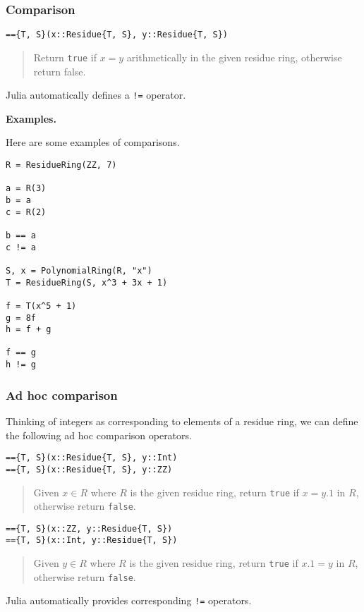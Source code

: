 \documentclass[a4paper,10pt]{article}
\newcommand{\code}{\lstinline}
\newcommand{\desc}[1]{\vspace{-3mm}\begin{quote}#1\end{quote}}
\begin{document}
{{{\subsubsection{Comparison}

\begin{lstlisting}
=={T, S}(x::Residue{T, S}, y::Residue{T, S})
\end{lstlisting}

\desc{Return \code{true} if $x = y$ arithmetically in the given residue ring, 
otherwise return false.}

Julia automatically defines a \code{!=} operator.

\textbf{Examples.}

Here are some examples of comparisons.

\begin{lstlisting}
R = ResidueRing(ZZ, 7)

a = R(3)
b = a
c = R(2)

b == a
c != a

S, x = PolynomialRing(R, "x")
T = ResidueRing(S, x^3 + 3x + 1)

f = T(x^5 + 1)
g = 8f
h = f + g

f == g
h != g
\end{lstlisting}

\subsubsection{Ad hoc comparison}

Thinking of integers as corresponding to elements of a residue ring, we
can define the following ad hoc comparison operators.

\begin{lstlisting}
=={T, S}(x::Residue{T, S}, y::Int)
=={T, S}(x::Residue{T, S}, y::ZZ)
\end{lstlisting}

\desc{Given $x \in R$ where $R$ is the given residue ring, return \code{true} 
if $x = y.1$ in $R$, otherwise return \code{false}.}

\begin{lstlisting}
=={T, S}(x::ZZ, y::Residue{T, S})
=={T, S}(x::Int, y::Residue{T, S})
\end{lstlisting}

\desc{Given $y \in R$ where $R$ is the given residue ring, return \code{true} 
if $x.1 = y$ in $R$, otherwise return \code{false}.}

Julia automatically provides corresponding \code{!=} operators.

}}}
\end{document}
